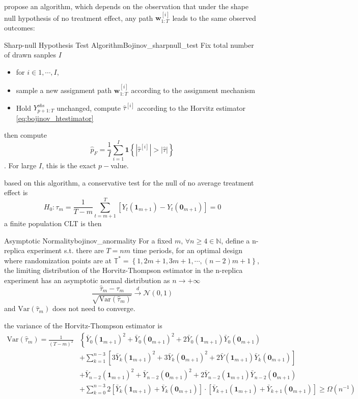 \documentclass[twoside]{article}
\begin{document}
\citet{bojinov2023design} propose an algorithm, which depends on the observation that under the shape null hypothesis of no treatment effect, any path $\mathbf{w}_{1:T}^{[i]}$ leads to the same observed outcomes: 
\begin{algorithm}{Sharp-null Hypothesis Test Algorithm}{Bojinov_sharpnull_test}
    Fix total number of drawn sanples $I$
    \begin{itemize}
        \item for $i\in 1,\cdots,I$,
        \item sample a new assignment path $\mathbf{w}_{1:T}^{[i]}$ according to the assignment mechanism 
        \item Hold $Y^{obs}_{p+1:T}$ unchanged, compute $\hat{\tau}^{[i]}$ according to the Horvitz estimator \ref{eq:bojinov_htestimator}
    \end{itemize}
    then compute $$ \hat{p}_F = \frac{1}{I} \sum^I_{i=1}\mathbf{1}\left\{\left\vert\hat{\tau}^{[i]}\right\vert > \left\vert \hat{\tau} \right\vert \right\} $$. For large $I$, this is the exact $p-$value.
\end{algorithm}
based on this algorithm, a conservative test for the null of no average treatment effect is 
$$ H_0: \tau_m = \frac{1}{T-m} \sum^T_{t=m+1}\left[Y_t(\mathbf{1}_{m+1}) - Y_t(\mathbf{0}_{m+1}) \right] = 0 $$
a finite population CLT is then 
\begin{theorem}{Asymptotic Normality}{bojinov_anormality}
    For a fixed $m$, $\forall n\geq 4 \in \mathbb{N}$, define a n-replica experiment s.t. there are $T=nm$ time periods, for an optimal design where randomization points are at $\mathbb{T}^* =\left\{1,2m+1,3m+1,\cdots,(n-2)m+1\right\}$, the limiting distribution of the Horvitz-Thompson estimator in the n-replica experiment has an asymptotic normal distribution as $n\rightarrow +\infty$
    \begin{equation*}
        \frac{\hat{\tau}_m-\tau_m}{\sqrt{\mathrm{Var}\left(\hat{\tau}_m\right)}} \xrightarrow{d} \mathcal{N}(0,1)
    \end{equation*}
    and $\mathrm{Var}(\hat{\tau}_m)$ does not need to converge.
\end{theorem}
the variance of the Horvitz-Thompson estimator is 
\begin{align*}
    \mathrm{Var}(\hat{\tau}_m) = \frac{1}{(T-m)^2} & \left\{ \bar{Y}_0(\mathbf{1}_{m+1})^2 + \bar{Y}_0(\mathbf{0}_{m+1})^2 + 2\bar{Y}_0(\mathbf{1}_{m+1})\bar{Y}_0(\mathbf{0}_{m+1}) \right. \\
    & + \sum^{n-3}_{k=1}\left[ 3\bar{Y}_k(\mathbf{1}_{m+1})^2 + 3 \bar{Y}_k(\mathbf{0}_{m+1})^2 + 2 \bar{Y}(\mathbf{1}_{m+1}) \bar{Y}_k(\mathbf{0}_{m+1}) \right] \\
    & + \bar{Y}_{n-2}(\mathbf{1}_{m+1})^2 + \bar{Y}_{n-2}(\mathbf{0}_{m+1})^2 + 2 \bar{Y}_{n-2}(\mathbf{1}_{m+1})\bar{Y}_{n-2}(\mathbf{0}_{m+1}) \\
    & + \sum^{n-3}_{k=0} 2 \left[\bar{Y}_k(\mathbf{1}_{m+1})+ \bar{Y}_k(\mathbf{0}_{m+1})\right] \cdot \left[\bar{Y}_{k+1}(\mathbf{1}_{m+1})+ \bar{Y}_{k+1}(\mathbf{0}_{m+1})\right] \geq \Omega(n^{-1})
\end{align*}
\end{document}
